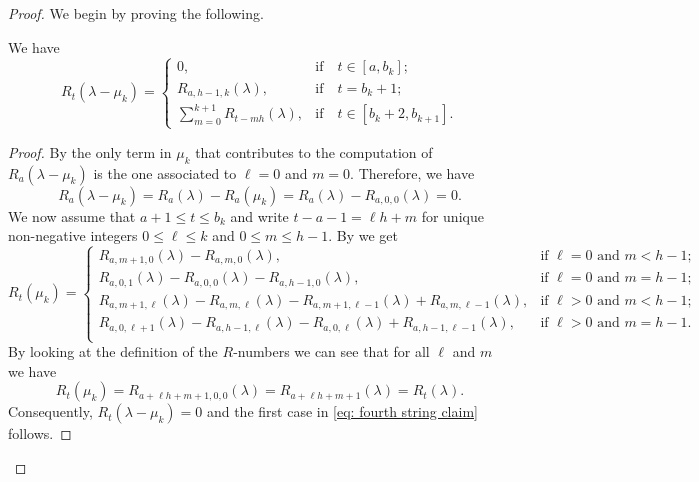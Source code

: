 \begin{proof}
We begin by proving the following.
 \begin{claim}\label{claim: fourth string claim}
  We have
    \begin{equation}\label{eq: fourth string claim}
       R_{t}(\lambda - \mu_k)  = \left\{\begin{array}{ll}
            0, &  \text{if}\quad t\in [a,b_{k}];\\[5pt]
            R_{a,h-1,k}(\lambda) , &  \text{if}\quad t=b_{k}+1;\\[5pt]
          \displaystyle  \sum_{m=0}^{k+1}R_{t - mh}(\lambda),& \text{if}\quad t\in [b_{k}+2,b_{k+1}].
        \end{array}\right.
    \end{equation}
    \end{claim}
\begin{proof}
By  the only term in $\mu_k$ that contributes to the computation of $R_{a}(\lambda - \mu_k)$  is the one associated to $\ell =0$ and $m=0$. Therefore, we have
    \begin{equation}
R_{a}(\lambda -\mu_{k}) = R_a(\lambda ) -R_a(\mu_k) = R_{a}(\lambda)-R_{a,0,0}(\lambda)=0. 
    \end{equation}
    We now assume that $a+1\leq t\leq b_k$ and write $t-a-1=\ell h+m$ for unique non-negative integers $0\leq \ell \leq k$ and $0\leq m \leq h-1$. 
    By  we get
    \begin{equation}
        R_t(\mu_k) = \left\{ \begin{array}{ll}
       R_{a,m+1,0}(\lambda)-R_{a,m,0}(\lambda),      &  \mbox{if } \ell = 0 \mbox{ and } m<h-1; \\[3pt]
       R_{a,0,1}(\lambda)-R_{a,0,0}(\lambda)-R_{a,h-1,0}(\lambda) ,     & \mbox{if } \ell = 0 \mbox{ and } m=h-1; \\[3pt]
       R_{a,m+1,\ell}(\lambda)-R_{a,m,\ell}(\lambda) -R_{a,m+1,\ell -1}(\lambda) +R_{a,m,\ell -1}(\lambda), & \mbox{if } \ell > 0 \mbox{ and } m<h-1; \\[3pt]
       R_{a,0,\ell +1}(\lambda)-R_{a,h-1,\ell}(\lambda) -R_{a,0,\ell }(\lambda) +R_{a,h-1,\ell -1}(\lambda), & \mbox{if } \ell > 0 \mbox{ and } m=h-1. \\
        \end{array} \right.
    \end{equation}
 By looking at the definition of the $R$-numbers we can see that for all $\ell $ and $m$ we have
 \begin{equation}
      R_t(\mu_k) = R_{a+\ell h +m+1,0,0} (\lambda)=R_{a+\ell h +m+1} (\lambda) =R_{t}(\lambda) .
 \end{equation}
Consequently, $ R_t(\lambda - \mu_k)=0$ and the first case in \cref{eq: fourth string claim} follows.


\end{proof}
\end{proof}
